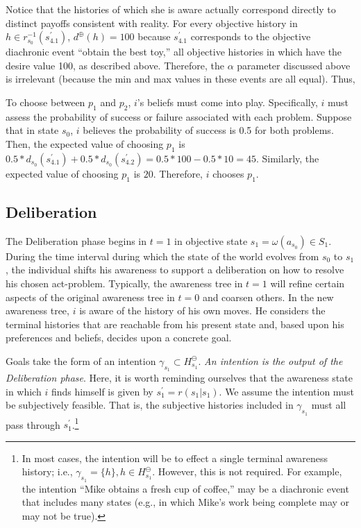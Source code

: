 \documentclass[
11pt,
titlepage,
reqno,
]{article}%
\theoremstyle{definition}
\begin{document}
Notice that the histories of which she is aware actually correspond directly to distinct payoffs consistent with reality.
For every objective history in $h\in r^{-1}_{s_0}(s_{4.1}^\prime)$, $d^\oplus(h)=100$ because $s_{4.1}^\prime$ corresponds to the objective diachronic event ``obtain the best toy,'' all objective histories in which have the desire value 100, as described above.
Therefore, the $\alpha$ parameter discussed above is irrelevant (because the min and max values in these events are all equal).
Thus, 

To choose between $p_1$ and $p_2$, $i$'s beliefs must come into play.
Specifically, $i$ must assess the probability of success or failure associated with each problem. 
Suppose that in state $s_0$, $i$  believes the probability of success is 0.5 for both problems. 
Then, the expected value of choosing $p_1$ is $0.5*d_{s_0}(s^\prime_{4.1})+0.5*d_{s_0}(s^\prime_{4.2})=0.5*100-0.5*10=45$.
Similarly, the expected value of choosing $p_1$ is $20$.
Therefore, $i$ chooses $p_1$.


\subsection{Deliberation}
The Deliberation phase begins in $t=1$ in objective state $s_1=\omega(a_{s_0})\in S_1$.
During the time interval during which the state of the world evolves from  $s_0$ to $s_1$, the individual shifts his awareness to support a deliberation on how to resolve his chosen act-problem. 
Typically, the awareness tree in $t=1$ will refine certain aspects of the original awareness tree in $t=0$ and coarsen others.
In the new awareness tree, $i$ is aware of the history of his own moves.
He considers the terminal histories that are reachable from his present state and, based upon his preferences and beliefs, decides upon a concrete goal.

Goals take the form of an intention $\gamma_{s_1}\subset H^\ominus_{s_1}$.
\textit{An intention is the output of the Deliberation phase}.
Here, it is worth reminding ourselves that the awareness state in which $i$ finds himself is given by $s^\prime_1=r(s_1|s_1)$.
We assume the intention must be subjectively feasible.
That is, the subjective histories included in $\gamma_{s_1}$ must all pass through $s^\prime_1$.\footnote
{
	In most cases, the intention will be to effect a single terminal awareness history; i.e., $\gamma_{s_1}=\{h\}, h\in H^\ominus_{s_1}$. 
	However, this is not required. 
	For example, the intention ``Mike obtains a fresh cup of coffee,'' may be a diachronic event that includes many states (e.g., in which Mike's work being complete may or may not be true).
}
 
\end{document}
